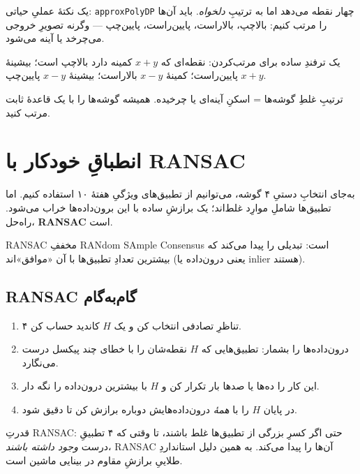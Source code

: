 \documentclass[12pt,a4paper]{article}
\begin{document}
یک نکتهٔ عملیِ حیاتی: \texttt{approxPolyDP} چهار نقطه می‌دهد اما به ترتیبِ \emph{دلخواه}. باید آن‌ها را مرتب کنیم: بالا‌چپ، بالا‌راست، پایین‌راست، پایین‌چپ — وگرنه تصویرِ خروجی می‌چرخد یا آینه می‌شود.

\begin{riyazi}
یک ترفندِ ساده برای مرتب‌کردن: نقطه‌ای که $x{+}y$ کمینه دارد بالا‌چپ است؛ بیشینهٔ $x{+}y$ پایین‌راست؛ کمینهٔ $x{-}y$ بالا‌راست؛ بیشینهٔ $x{-}y$ پایین‌چپ.
\end{riyazi}

\begin{hoshdar}
ترتیبِ غلطِ گوشه‌ها = اسکنِ آینه‌ای یا چرخیده. همیشه گوشه‌ها را با یک قاعدهٔ ثابت مرتب کنید.
\end{hoshdar}

\section{انطباقِ خودکار با RANSAC}

به‌جای انتخابِ دستیِ ۴ گوشه، می‌توانیم از تطبیق‌های ویژگیِ هفتهٔ ۱۰ استفاده کنیم. اما تطبیق‌ها شاملِ موارِد غلط‌اند؛ یک برازشِ ساده با این برون‌داده‌ها خراب می‌شود. راه‌حل، \textbf{RANSAC} است.

\begin{nokte}
RANSAC مخففِ RANdom SAmple Consensus است: تبدیلی را پیدا می‌کند که بیشترین تعدادِ تطبیق‌ها با آن «موافق»‌اند (یعنی درون‌داده یا inlier هستند).
\end{nokte}

\subsection{RANSAC گام‌به‌گام}

\begin{enumerate}
  \item ۴ تناظرِ تصادفی انتخاب کن و یک $H$ کاندید حساب کن.
  \item درون‌داده‌ها را بشمار: تطبیق‌هایی که $H$ نقطه‌شان را با خطای چند پیکسل درست می‌نگارد.
  \item این کار را ده‌ها یا صدها بار تکرار کن و $H$ با بیشترین درون‌داده را نگه دار.
  \item در پایان $H$ را با \emph{همهٔ} درون‌داده‌هایش دوباره برازش کن تا دقیق شود.
\end{enumerate}

\begin{yaddasht}
قدرتِ RANSAC: حتی اگر کسرِ بزرگی از تطبیق‌ها غلط باشند، تا وقتی که ۴ تطبیقِ درست \emph{وجود داشته باشند}، RANSAC آن‌ها را پیدا می‌کند. به همین دلیل استانداردِ طلاییِ برازشِ مقاوم در بینایی ماشین است.
\end{yaddasht}
\end{document}
